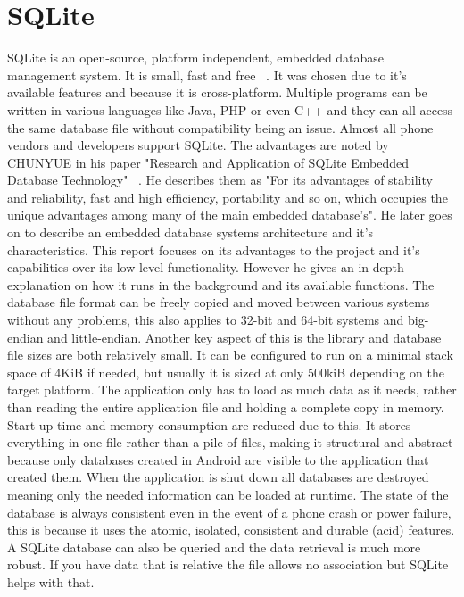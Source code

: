 \section{SQLite}
SQLite is an open-source, platform independent, embedded database management system. It is small, fast and free ~\cite{sqlite}. It was chosen due to it's available features and because it is cross-platform. Multiple programs can be written in various languages like Java, PHP or even C++ and they can all access the same database file without compatibility being an issue. Almost all phone vendors and developers support SQLite. The advantages are noted by CHUNYUE in his paper "Research and Application of SQLite Embedded Database Technology" ~\cite{bi}. He describes them as "For its advantages of stability and reliability, fast and high efficiency, portability and so on, which occupies the unique advantages among many of the main embedded database's". He later goes on to describe an embedded database systems architecture and it's characteristics. This report focuses on its advantages to the project and it's capabilities over its low-level functionality. However he gives an in-depth explanation on how it runs in the background and its available functions.
The database file format can be freely copied and moved between various systems without any problems, this also applies to 32-bit and 64-bit systems and big-endian and little-endian. Another key aspect of this is the library and database file sizes are both relatively small. It can be configured to run on a minimal stack space of 4KiB if needed, but usually it is sized at only 500kiB depending on the target platform. The application only has to load as much data as it needs, rather than reading the entire application file and holding a complete copy in memory. Start-up time and memory consumption are reduced due to this. It stores everything in one file rather than a pile of files, making it structural and abstract because only databases created in Android are visible to the application that created them. When the application is shut down all databases are destroyed meaning only the needed information can be loaded at runtime. The state of the database is always consistent even in the event of a phone crash or power failure, this is because it uses the atomic, isolated, consistent and durable (acid) features. A SQLite database can also be queried and the data retrieval is much more robust. If you have data that is relative the file allows no association but SQLite helps with that.

\pagebreak
